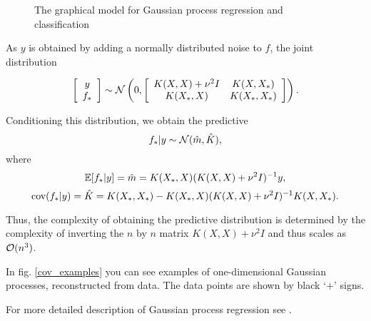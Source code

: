 \begin{figure}[!t]
	\centering
	\scalebox{0.9}{
		
	}
	\caption{The graphical model for Gaussian process regression and classification}
	\label{gp_graphical_model}
\end{figure}

As $y$ is obtained by adding a normally distributed noise to $f$, the joint distribution

$$
\left [ \begin{array}{c} y\\ f_* \end{array} \right ]
\sim
\mathcal{N} \left ( 0, \left [\begin{array}{cc} K(X, X) + \nu^2 I & K(X, X_*)\\ K(X_*, X) & K(X_*, X_*) \end{array} \right] \right ).
$$

Conditioning this distribution, we obtain the predictive
$$f_* | y \sim \mathcal{N}( \hat m, \hat K ),$$
where
$$\mathbb{E}[f_* | y] = \hat m = K(X_*, X) (K(X, X) + \nu^2 I)^{-1} y,$$
$$\mbox{cov}(f_* | y ) = \hat K = K(X_*, X_*) - K(X_*, X)(K(X, X) + \nu^2 I)^{-1}K(X, X_*).$$

Thus, the complexity of obtaining the predictive distribution is determined by the complexity of inverting the $n$ by $n$ matrix $K(X, X) + \nu^2 I$ and thus scales as $\mathcal{O}(n^3)$.

% 			


In fig. \ref{cov_examples} you can see examples of one-dimensional Gaussian processes, reconstructed from data. The data points are shown by black `$+$' signs. 

For more detailed description of Gaussian process regression see \cite{GPinML}.